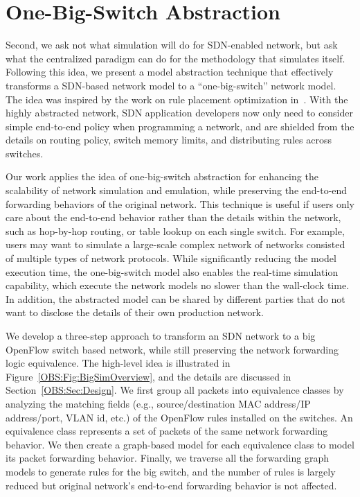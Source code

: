 \section{One-Big-Switch Abstraction}
\label{OBS:Sec:Intro}

Second, we ask not what simulation will do for SDN-enabled network, but ask what the centralized paradigm can do for the methodology that simulates itself.
Following this idea, we present a model abstraction technique that effectively transforms
a SDN-based network model to a ``one-big-switch'' network model.
The idea was inspired by the work on rule placement optimization in~\cite{OneBigSwitchAbstraction}.
With the highly abstracted network, SDN application developers now only need to consider
simple end-to-end policy when programming a network,
and are shielded from the details on routing policy, switch memory limits,
and distributing rules across switches.

Our work applies the idea of one-big-switch abstraction for enhancing the scalability
of network simulation and emulation, while preserving the end-to-end forwarding behaviors of the original network.
This technique is useful if users only care about the end-to-end behavior rather than
the details within the network, such as hop-by-hop routing, or table lookup on each single switch.
For example, users may want to simulate a large-scale complex network of networks consisted of multiple types of network protocols.
While significantly reducing the model execution time, the one-big-switch model also enables the real-time simulation capability,
which execute the network models no slower than the wall-clock time.
In addition, the abstracted model can be shared by different parties that do not want to disclose the details
of their own production network.

We develop a three-step approach to transform an SDN network to a big OpenFlow switch based network,
while still preserving the network forwarding logic equivalence.
The high-level idea is illustrated in Figure~\ref{OBS:Fig:BigSimOverview},
and the details are discussed in Section~\ref{OBS:Sec:Design}.
We first group all packets into equivalence classes by analyzing the matching fields
(e.g., source/destination MAC address/IP address/port, VLAN id, etc.)
of the OpenFlow rules installed on the switches.
An equivalence class represents a set of packets of the same network forwarding behavior.
We then create a graph-based model for each equivalence class to model its packet forwarding behavior.
Finally, we traverse all the forwarding graph models to generate rules for the big switch,
and the number of rules is largely reduced but original network's end-to-end forwarding behavior is not affected.


